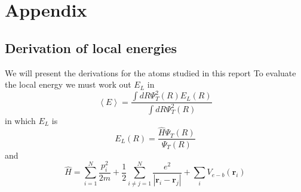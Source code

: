 \documentclass{article}
\begin{document}






{}





\section{Appendix}
\subsection{Derivation of local energies}
We will present the derivations for the atoms studied in this report
To evaluate the local energy we must work out $E_L$ in 
\begin{equation}
 \left\langle E \right\rangle = \frac{\int dR \Psi_T^2(R)E_L(R)}{\int dR \Psi_T^2(R)}
\end{equation}
in which $E_L$ is
\begin{equation}
 E_L(R)=\frac{\hat{H}\Psi_T(R)}{\Psi_T(R)}
\end{equation}
and
\begin{equation}
 \hat{H}=\sum_{i=1}^N \frac{p_i^2}{2m}+\frac12 \sum_{i\ne j=1}^N \frac{e^2}{\left| \mathbf{r}_i -\mathbf{r}_j \right|}+\sum_i V_{e-b}(\mathbf{r}_i)
\end{equation}
\end{document}
